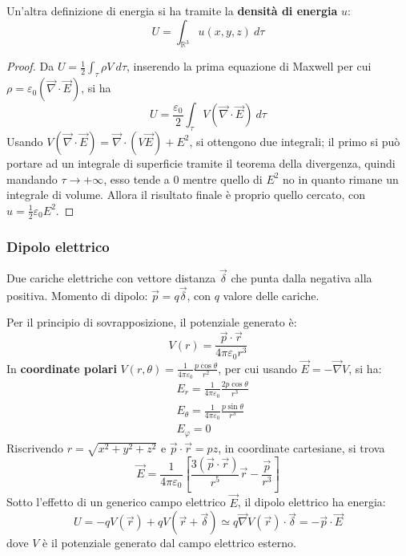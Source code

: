 \documentclass[10pt, a4paper]{scrartcl}
\numberwithin{equation}{subsection}
\theoremstyle{style1}
\newenvironment{boxenv}[1][]{
    \begin{eqbox}[#1]
    }{
   \end{eqbox}
}
\begin{document}
Un'altra definizione di energia si ha tramite la \textbf{densit\`a di energia} $u$:
\begin{equation}
	U = \int_{\mathbb{R}^3} u(x,y,z) \ d\tau  
\end{equation}
\begin{boxenv}[]
\begin{proof}
	Da $U = \frac{1}{2}\int_{\tau } \rho V \ d\tau $, inserendo la prima equazione di Maxwell per cui $\rho  = \varepsilon _0 (\vec{\nabla }\cdot \vec{E})$, si ha 
	\begin{equation}
		U = \frac{\varepsilon _0}{2} \int_{\tau } V (\vec{\nabla }\cdot \vec{E}) \ d\tau 
	\end{equation}
	Usando $V(\vec{\nabla }\cdot \vec{E}) = \vec{\nabla }\cdot (V\vec{E})+E^2$, si ottengono due integrali; il primo si pu\`o portare ad un integrale di superficie tramite il teorema della divergenza, quindi mandando $\tau \to+\infty$, esso tende a $0$ mentre quello di $E^2$ no in quanto rimane un integrale di volume. Allora il risultato finale \`e proprio quello cercato, con $u = \frac{1}{2}\varepsilon _0 E^2$.
\end{proof}
\end{boxenv}



\subsubsection{Dipolo elettrico}
Due cariche elettriche con vettore distanza $\vec{\delta }$ che punta dalla negativa alla positiva. Momento di dipolo: $\vec{p} = q \vec{\delta }$, con $q$ valore delle cariche.

Per il principio di sovrapposizione, il potenziale generato \`e:
 \begin{equation}
 	V(r) = \frac{\vec{p}\cdot \vec{r}}{4 \pi \varepsilon _0 r^3}
 \end{equation}
In \textbf{coordinate polari} $V(r,\theta ) = \frac{1}{4\pi \varepsilon _0}\frac{p \cos \theta }{r^2}$, per cui usando $\vec{E} = - \vec{\nabla }V$, si ha:
\begin{equation}
	\begin{split}
		&E_r = \frac{1}{4\pi \varepsilon _0} \frac{2 p \cos \theta }{r^3}\\
		&E_\theta  = \frac{1}{4 \pi \varepsilon _0} \frac{p \sin \theta  }{r^3}\\
		& E_\varphi = 0
	\end{split}
\end{equation}
Riscrivendo $r = \sqrt{x^2 + y^2 + z^2} $ e $\vec{p}\cdot \vec{r}= p z$, in coordinate cartesiane, si trova
\begin{equation}
	\vec{E} = \frac{1}{4\pi \varepsilon _0 }\left[ \frac{3(\vec{p}\cdot \vec{r})}{r^5}\vec{r} - \frac{\vec{p}}{r^3} \right] 
\end{equation}
Sotto l'effetto di un generico campo elettrico $\vec{E}$, il dipolo elettrico ha energia:
\begin{equation}
	U = -qV(\vec{r}) + q V(\vec{r}+\vec{\delta }) \simeq q \vec{\nabla }V (\vec{r}) \cdot \vec{\delta } =  -\vec{p}\cdot \vec{E}
\end{equation}
dove $V$ \`e il potenziale generato dal campo elettrico esterno.
\end{document}
